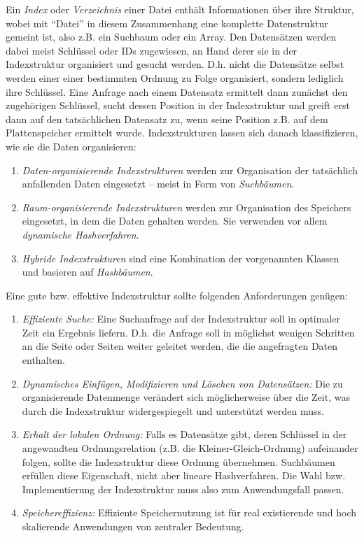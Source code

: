 Ein \textit{Index} oder \textit{Verzeichnis} einer Datei enthält Informationen über ihre Struktur, wobei mit "`Datei"' in diesem Zusammenhang eine komplette Datenstruktur gemeint ist, also z.B. ein Suchbaum oder ein Array. Den Datensätzen werden dabei meist Schlüssel oder IDs zugewiesen, an Hand derer sie in der Indexstruktur organisiert und gesucht werden. D.h. nicht die Datensätze selbst werden einer einer bestimmten Ordnung zu Folge organisiert, sondern lediglich ihre Schlüssel. Eine Anfrage nach einem Datensatz ermittelt dann zunächst den zugehörigen Schlüssel, sucht dessen Position in der Indexstruktur und greift erst dann auf den tatsächlichen Datensatz zu, wenn seine Position z.B. auf dem Plattenspeicher ermittelt wurde. Indexstrukturen lassen sich danach klassifizieren, wie sie die Daten organisieren: 
\begin{enumerate}
\setlength{\itemsep}{20pt}
	\item \textit{Daten-organisierende Indexstrukturen} werden zur Organisation der tatsächlich anfallenden Daten eingesetzt -- meist in Form von \textit{Suchbäumen}. 
	\item \textit{Raum-organisierende Indexstrukturen} werden zur Organisation des Speichers eingesetzt, in dem die Daten gehalten werden. Sie verwenden vor allem \textit{dynamische Hashverfahren}. 
	\item \textit{Hybride Indexstrukturen} sind eine Kombination der vorgenannten Klassen und basieren auf \textit{Hashbäumen}.   
\end{enumerate}
Eine gute bzw. effektive Indexstruktur sollte folgenden Anforderungen genügen: 
\begin{enumerate}
\setlength{\itemsep}{20pt}
	\item \textit{Effiziente Suche:} Eine Suchanfrage auf der Indexstruktur soll in optimaler Zeit ein Ergebnis liefern. D.h. die Anfrage soll in möglichst wenigen Schritten an die Seite oder Seiten weiter geleitet werden, die die angefragten Daten enthalten.
	\item \textit{Dynamisches Einfügen, Modifizieren und Löschen von Datensätzen:} Die zu organisierende Datenmenge verändert sich möglicherweise über die Zeit, was durch die Indexstruktur widergespiegelt und unterstützt werden muss.  
	\item \textit{Erhalt der lokalen Ordnung:} Falls es Datensätze gibt, deren Schlüssel in der angewandten Ordnungsrelation (z.B. die Kleiner-Gleich-Ordnung) aufeinander folgen, sollte die Indexstruktur diese Ordnung übernehmen. Suchbäumen erfüllen diese Eigenschaft, nicht aber lineare Hashverfahren. Die Wahl bzw. Implementierung der Indexstruktur muss also zum Anwendungsfall passen. 
	\item \textit{Speichereffizienz:} Effiziente Speichernutzung ist für real existierende und hoch skalierende Anwendungen von zentraler Bedeutung. 
\end{enumerate}

